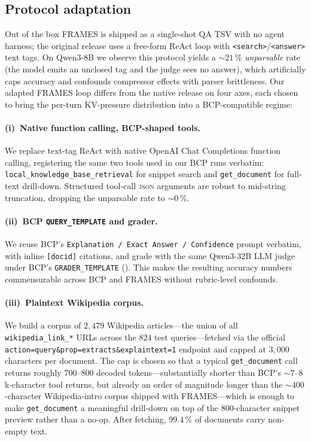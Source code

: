 \documentclass[11pt]{article}
\begin{document}
\subsection{Protocol adaptation}
\label{appendix:frames-protocol}

Out of the box FRAMES is shipped as a single-shot QA TSV with no
agent harness; the original release uses a free-form ReAct loop with
\texttt{<search>}/\texttt{<answer>} text tags. On Qwen3-8B we observe
this protocol yields a $\sim$$21$\,\% \emph{unparsable} rate (the
model emits an unclosed tag and the judge sees no answer), which
artificially caps accuracy and confounds compressor effects with
parser brittleness. Our adapted FRAMES loop differs from the native
release on four axes, each chosen to bring the per-turn KV-pressure
distribution into a BCP-compatible regime:

\paragraph{(i)~Native function calling, BCP-shaped tools.}
We replace text-tag ReAct with native OpenAI Chat Completions
function calling, registering the same two tools used in our BCP
runs verbatim: \texttt{local\_knowledge\_base\_retrieval} for
snippet search and \texttt{get\_document} for full-text drill-down.
Structured tool-call \textsc{json} arguments are robust to mid-string
truncation, dropping the unparsable rate to $\sim$$0$\,\%.

\paragraph{(ii)~BCP \texttt{QUERY\_TEMPLATE} and grader.}
We reuse BCP's \texttt{Explanation / Exact Answer / Confidence}
prompt verbatim, with inline \texttt{[docid]} citations, and grade
with the same Qwen3-32B LLM judge under BCP's
\texttt{GRADER\_TEMPLATE} (). This makes
the resulting accuracy numbers commensurable across BCP and FRAMES
without rubric-level confounds.

\paragraph{(iii)~Plaintext Wikipedia corpus.}
We build a corpus of $2{,}479$ Wikipedia articles---the union of
all \texttt{wikipedia\_link\_*} URLs across the $824$ test
queries---fetched via the official
\texttt{action=query\&prop=extracts\&explaintext=1} endpoint and
capped at $3{,}000$ characters per document. The cap is chosen so
that a typical \texttt{get\_document} call returns roughly
$700$--$800$ decoded tokens---substantially shorter than BCP's
$\sim$$7$--$8$k-character tool returns, but already an order of
magnitude longer than the $\sim$$400$-character Wikipedia-intro
corpus shipped with FRAMES---which is enough to make
\texttt{get\_document} a meaningful drill-down on top of the
$800$-character snippet preview rather than a no-op. After fetching,
$99.4$\,\% of documents carry non-empty text.
\end{document}
